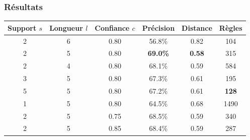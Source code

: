 \documentclass{beamer}
\begin{document}
\begin{frame}
\frametitle{Résultats}
\footnotesize
\begin{center}
\begin{tabular}{|c|c|c||c|c|c|}
\hline
Support $s$&Longueur $l$&Confiance $c$&Précision&Distance&Règles\\
\hline
2&6&0.80&56.8\%&0.82&104\\
\hline
2&5&0.80&\textbf{69.0\%}&\textbf{0.58}&315\\
\hline
2&4&0.80&68.1\%&0.59&584\\
\hline
\hline
3&5&0.80&67.3\%&0.61&195\\
\hline
5&5&0.80&67.2\%&0.61&\textbf{128}\\
\hline
1&5&0.80&64.5\%&0.68&1490\\
\hline
\hline
2&5&0.75&68.5\%&0.59&340\\
\hline
2&5&0.85&68.4\%&0.59&287\\
\hline
\end{tabular}
\end{center}
\normalsize
\end{frame}
\end{document}
